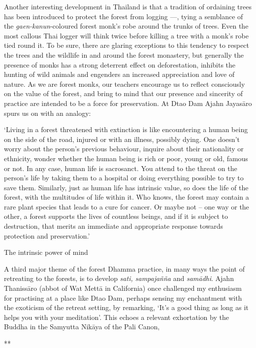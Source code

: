 Another interesting development in Thailand is that a tradition of
ordaining trees has been introduced to protect the forest from logging
---, tying a semblance of the \emph{gaen-kanun}-coloured forest monk's
robe around the trunks of trees. Even the most callous Thai logger will
think twice before killing a tree with a monk's robe tied round it. To
be sure, there are glaring exceptions to this tendency to respect the
trees and the wildlife in and around the forest monastery, but generally
the presence of monks has a strong deterrent effect on deforestation,
inhibits the hunting of wild animals and engenders an increased
appreciation and love of nature. As we are forest monk\emph{s}, our
teachers encourage us to reflect consciously on the value of the forest,
and bring to mind that our presence and sincerity of practice are
intended to be a force for preservation. At Dtao Dam Ajahn Jayasāro
spurs us on with an analogy:

`Living in a forest threatened with extinction is like encountering a
human being on the side of the road, injured or with an illness,
possibly dying. One doesn't worry about the person's previous behaviour,
inquire about their nationality or ethnicity, wonder whether the human
being is rich or poor, young or old, famous or not. In any case, human
life is sacrosanct. You attend to the threat on the person's life by
taking them to a hospital or doing everything possible to try to save
them. Similarly, just as human life has intrinsic value, so does the
life of the forest, with the multitudes of life within it. Who knows,
the forest may contain a rare plant species that leads to a cure for
cancer. Or maybe not -- one way or the other, a forest supports the
lives of countless beings, and if it is subject to destruction, that
merits an immediate and appropriate response towards protection and
preservation.'

The intrinsic power of mind

A third major theme of the forest Dhamma practice, in many ways the
point of retreating to the forests, is to develop \emph{sati,
sampajañña} and \emph{samādhi}. Ajahn Thanissāro (abbot of Wat Mettā in
California) once challenged my enthusiasm for practising at a place like
Dtao Dam, perhaps sensing my enchantment with the exoticism of the
retreat setting, by remarking, `It's a good thing as long as it helps
you with your meditation'. This echoes a relevant exhortation by the
Buddha in the Samyutta Nikāya of the Pali Canon,

**

